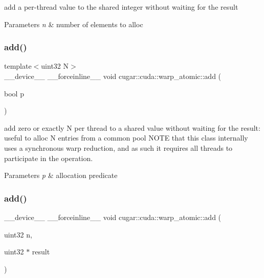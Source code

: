 add a per-\/thread value to the shared integer without waiting for the result


\begin{DoxyParams}{Parameters}
{\em n} & number of elements to alloc \\
\hline
\end{DoxyParams}
\mbox{\label{structcugar_1_1cuda_1_1warp__atomic_a78b3b809c6ef903abcc7d16ad1cac986}} 
\subsubsection{\texorpdfstring{add()}{add()}\hspace{0.1cm}{\footnotesize\ttfamily [2/6]}}
{\footnotesize\ttfamily template$<$uint32 N$>$ \\
\+\_\+\+\_\+device\+\_\+\+\_\+ \+\_\+\+\_\+forceinline\+\_\+\+\_\+ void cugar\+::cuda\+::warp\+\_\+atomic\+::add (\begin{DoxyParamCaption}\item[{bool}]{p }\end{DoxyParamCaption})\hspace{0.3cm}{\ttfamily [inline]}}

add zero or exactly N per thread to a shared value without waiting for the result\+: useful to alloc N entries from a common pool N\+O\+TE that this class internally uses a synchronous warp reduction, and as such it requires all threads to participate in the operation.


\begin{DoxyParams}{Parameters}
{\em p} & allocation predicate \\
\hline
\end{DoxyParams}
\mbox{\label{structcugar_1_1cuda_1_1warp__atomic_a9557611c92ecb065e6fefa030cb2c4a4}} 
\subsubsection{\texorpdfstring{add()}{add()}\hspace{0.1cm}{\footnotesize\ttfamily [3/6]}}
{\footnotesize\ttfamily \+\_\+\+\_\+device\+\_\+\+\_\+ \+\_\+\+\_\+forceinline\+\_\+\+\_\+ void cugar\+::cuda\+::warp\+\_\+atomic\+::add (\begin{DoxyParamCaption}\item[{uint32}]{n,  }\item[{uint32 $\ast$}]{result }\end{DoxyParamCaption})\hspace{0.3cm}{\ttfamily [inline]}}

